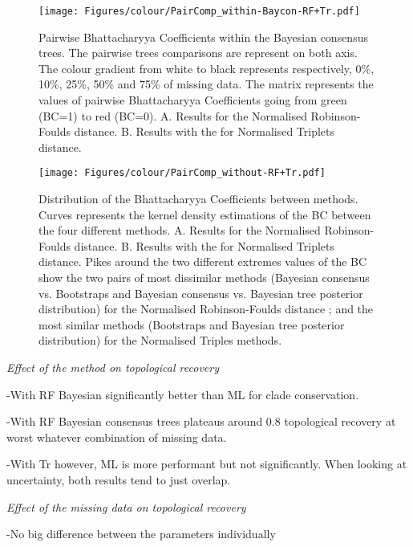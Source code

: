 \documentclass[12pt,letterpaper]{article}
\renewcommand{\subsection}[1]{%
\bigskip
\begin{center}
\begin{large}
\normalfont\itshape #1
\end{large}
\end{center}}
\begin{document}
\begin{figure} 
\centering
    \texttt{[image: Figures/colour/PairComp\_within-Baycon-RF+Tr.pdf]}
\caption{Pairwise Bhattacharyya Coefficients within the Bayesian consensus trees. The pairwise trees comparisons are represent on both axis. The colour gradient from white to black represents respectively, 0\%, 10\%, 25\%, 50\% and 75\% of missing data. The matrix represents the values of pairwise Bhattacharyya Coefficients going from green (BC=1) to red (BC=0). A. Results for the Normalised Robinson-Foulds distance. B. Results with the for Normalised Triplets distance.}
\label{Fig_Results_3}
\end{figure} %

\begin{figure} 
\centering
    \texttt{[image: Figures/colour/PairComp\_without-RF+Tr.pdf]}
\caption{Distribution of the Bhattacharyya Coefficients between methods. Curves represents the kernel density estimations of the BC between the four different methods. A. Results for the Normalised Robinson-Foulds distance. B. Results with the for Normalised Triplets distance. Pikes around the two different extremes values of the BC show the two pairs of most dissimilar methods (Bayesian consensus vs. Bootstraps and Bayesian consensus vs. Bayesian tree posterior distribution) for the Normalised Robinson-Foulds distance ; and the most similar methods (Bootstraps and Bayesian tree posterior distribution) for the Normalised Triples methods.}
\label{Fig_Results_4} %
\end{figure}





\subsection{Effect of the method on topological recovery}
-With RF Bayesian significantly better than ML for clade conservation.

-With RF Bayesian consensus trees plateaus around 0.8 topological recovery at worst whatever combination of missing data.

-With Tr however, ML is more performant but not significantly. When looking at uncertainty, both results tend to just overlap.

\subsection{Effect of the missing data on topological recovery}
-No big difference between the parameters individually
\end{document}
